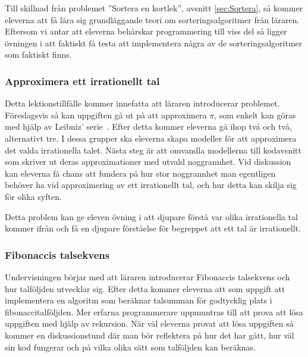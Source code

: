     \textcolor{WildStrawberry}{
        Till skillnad från problemet ''Sortera en kortlek'', avsnitt \ref{sec:Sortera}, så kommer eleverna att få lära sig grundläggande teori om sorteringsalgoritmer från läraren. Eftersom vi antar att eleverna behärskar programmering till viss del så ligger övningen i att faktiskt få testa att implementera några av de sorteringsalgoritmer som faktiskt finns.}
        
\subsubsection{Approximera ett irrationellt tal}
    \label{sec:approx}
    
    \textcolor{WildStrawberry}{
        Detta lektionstillfälle kommer innefatta att läraren introducerar problemet. Föreslagsvis så kan uppgiften gå ut på att approximera $\pi$, som enkelt kan göras med hjälp av Leibniz' serie~\cite{pi}. Efter detta kommer eleverna gå ihop två och två, alternativt tre. I dessa grupper ska eleverna skapa modeller för att approximera det valda irrationella talet. Nästa steg är att omvandla modellerna till kodavsnitt som skriver ut deras approximationer med utvald noggrannhet. 
        Vid diskussion kan eleverna få chans att fundera på hur stor noggrannhet man egentligen behöver ha vid approximering av ett irrationellt tal, och hur detta kan skilja sig för olika syften.
        }
        
    \textcolor{WildStrawberry}{
        Detta problem kan ge eleven övning i att djupare förstå var olika irrationella tal kommer ifrån och få en djupare förståelse för begreppet att ett tal är irrationellt.}
    
\subsubsection{Fibonaccis talsekvens}
    \label{sec:Fibonacci}
    
    \textcolor{WildStrawberry}{
        Undervisningen börjar med att läraren introducerar Fibonaccis talsekvens och hur talföljden utvecklar sig. Efter detta kommer eleverna att som uppgift att implementera en algoritm som beräknar talsumman för godtycklig plats i fibonaccitalföljden. Mer erfarna programmerare uppmuntras till att prova att lösa uppgiften med hjälp av rekursion. När väl eleverna provat att lösa uppgiften så kommer en diskussionstund där man bör reflektera på hur det har gått, hur väl sin kod fungerar och på vilka olika sätt som talföljden kan beräknas.}
        
